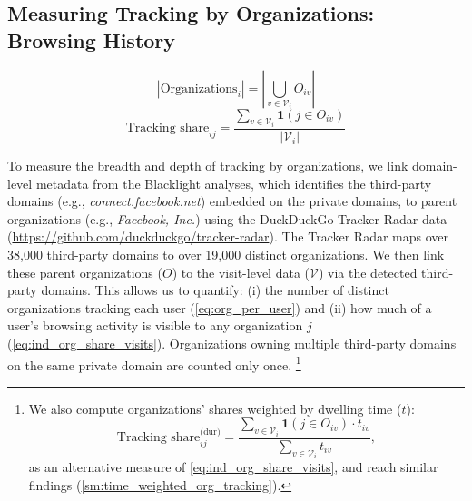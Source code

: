 \documentclass[12pt, letterpaper]{article}
\begin{document}
\subsection{Measuring Tracking by Organizations: Browsing History}\label{sec:browsing_history}

\begin{equation}\label{eq:org_per_user}
\left| \text{Organizations}_i \right| = 
\left| 
\bigcup_{v \in \mathcal{V}_i} O_{iv} 
\right|
\end{equation}
\begin{equation}\label{eq:ind_org_share_visits}
\text{Tracking share}_{ij} = 
\frac{
    \sum_{v \in \mathcal{V}_i}
    \mathbf{1}
    (j \in O_{iv})
}
{
    \vert \mathcal{V}_i \vert
}
\end{equation}

To measure the breadth and depth of tracking by organizations, we link domain-level metadata from the Blacklight analyses, which identifies the third-party domains (e.g., \textit{connect.facebook.net}) embedded on the private domains, to parent organizations (e.g., \textit{Facebook, Inc.}) using the DuckDuckGo Tracker Radar data (\url{https://github.com/duckduckgo/tracker-radar}).
The Tracker Radar maps over 38,000 third-party domains to over 19,000 distinct organizations. We then link these parent organizations ($O$) to the visit-level data ($\mathcal{V}$) via the detected third-party domains. This allows us to quantify: (i) the number of distinct organizations tracking each user (\cref{eq:org_per_user}) and (ii) how much of a user's browsing activity is visible to any organization $j$ (\cref{eq:ind_org_share_visits}). Organizations owning multiple third-party domains on the same private domain are counted only once.%
\footnote{
    We also compute organizations' shares weighted by dwelling time ($t$):
    \begin{equation}\label{eq:ind_org_share_duration}
        \text{Tracking share}_{ij}^{\text{(dur)}} = 
        \frac{
            \sum_{v \in \mathcal{V}_i} 
            \mathbf{1}
            (j \in O_{iv})
            \cdot
            t_{iv}
        }
        {
            \sum_{v \in \mathcal{V}_i} 
            t_{iv}
        },
    \end{equation}
    as an alternative measure of \cref{eq:ind_org_share_visits}, and reach similar findings (\cref{sm:time_weighted_org_tracking}).
}
\end{document}
